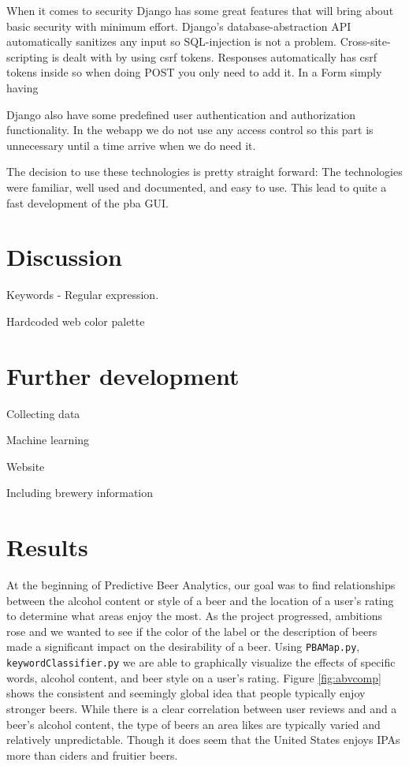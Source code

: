 \documentclass[10pt]{IEEEtran}
\begin{document}
When it comes to security Django has some great features that will bring about basic security with minimum effort.
Django's database-abstraction API automatically sanitizes any input so SQL-injection is not a problem.
Cross-site-scripting is dealt with by using csrf tokens.
Responses automatically has csrf tokens inside so when doing POST you only need to add it.
In a Form simply having {%
Django also have some predefined user authentication and authorization functionality.
In the webapp we do not use any access control so this part is unnecessary until a time arrive when we do need it.

The decision to use these technologies is pretty straight forward:
The technologies were familiar, well used and documented, and easy to use.
This lead to quite a fast development of the pba GUI.



\section{Discussion}

Keywords - Regular expression.

Hardcoded web color palette

\section{Further development}
Collecting data

Machine learning

Website

Including brewery information


\section{Results}
At the beginning of Predictive Beer Analytics, our goal was to find relationships between the alcohol content or style of a beer and the location of a user's rating to determine what areas enjoy the most. As the project progressed, ambitions rose and we wanted to see if the color of the label or the description of beers made a significant impact on the desirability of a beer. Using \texttt{PBAMap.py}, \texttt{keywordClassifier.py} we are able to graphically visualize the effects of specific words, alcohol content, and beer style on a user's rating. Figure \ref{fig:abvcomp} shows the consistent and seemingly global idea that people typically enjoy stronger beers. While there is a clear correlation between user reviews and and a beer's alcohol content, the type of beers an area likes are typically varied and relatively unpredictable. Though it does seem that the United States enjoys IPAs more than ciders and fruitier beers.

}
\end{document}
